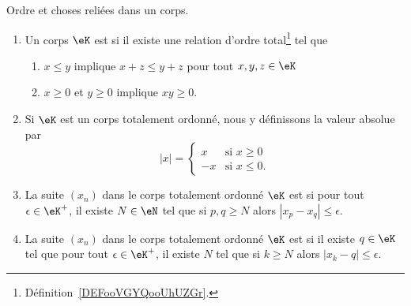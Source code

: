 \begin{definition}      \label{DefKCGBooLRNdJf}
    Ordre et choses reliées dans un corps.
    \begin{enumerate}
        \item \label{ITEMooOOOVooJWwIQr}
            Un corps \( \eK\) est  si il existe une relation d'ordre total\footnote{Définition~\ref{DEFooVGYQooUhUZGr}.} tel que
            \begin{enumerate}
                \item       \label{ITEMooZISJooWNxnBj}
                    \( x\leq y\) implique \( x+z\leq y+z\) pour tout \( x,y,z\in \eK\)
                \item   \label{CONDooBYYDooElXgPO}
                    \( x\geq 0\) et \( y\geq 0\) implique \( xy\geq 0\).
            \end{enumerate}
        \item       \label{ItemooWUGSooRSRvYC}
            Si \( \eK\) est un corps totalement ordonné, nous y définissons la valeur absolue par
            \begin{equation}     
                | x |=\begin{cases}
                    x    &   \text{si }x\geq 0\\
                    -x    &    \text{si } x\leq 0.
                \end{cases}
            \end{equation}
        \item       \label{ItemVXOZooTYpcYN}
    La suite \( (x_n)\) dans le corps totalement ordonné \( \eK\) est  si pour tout \( \epsilon\in \eK^+\), il existe \( N\in \eN\) tel que si \( p,q\geq N\) alors \( | x_p-x_q |\leq \epsilon\).
\item       \label{ITEMooDERQooLmJwFR}
    La suite \( (x_n)\) dans le corps totalement ordonné \( \eK\) est  si il existe \( q\in \eK\) tel que pour tout \( \epsilon\in \eK^+\), il existe \( N\) tel que si \( k\geq N\) alors \( | x_k-q |\leq \epsilon\).


\end{enumerate}
\end{definition}
